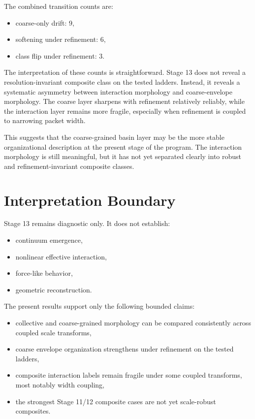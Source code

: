 \documentclass[11pt]{article}
\begin{document}
The combined transition counts are:
\begin{itemize}
\item coarse-only drift: $9$,
\item softening under refinement: $6$,
\item class flip under refinement: $3$.
\end{itemize}

The interpretation of these counts is straightforward. Stage 13 does not reveal a resolution-invariant composite class on the tested ladders. Instead, it reveals a systematic asymmetry between interaction morphology and coarse-envelope morphology. The coarse layer sharpens with refinement relatively reliably, while the interaction layer remains more fragile, especially when refinement is coupled to narrowing packet width.

This suggests that the coarse-grained basin layer may be the more stable organizational description at the present stage of the program. The interaction morphology is still meaningful, but it has not yet separated clearly into robust and refinement-invariant composite classes.

\section{Interpretation Boundary}

Stage 13 remains diagnostic only. It does not establish:
\begin{itemize}
\item continuum emergence,
\item nonlinear effective interaction,
\item force-like behavior,
\item geometric reconstruction.
\end{itemize}

The present results support only the following bounded claims:
\begin{itemize}
\item collective and coarse-grained morphology can be compared consistently across coupled scale transforms,
\item coarse envelope organization strengthens under refinement on the tested ladders,
\item composite interaction labels remain fragile under some coupled transforms, most notably width coupling,
\item the strongest Stage 11/12 composite cases are not yet scale-robust composites.
\end{itemize}
\end{document}
